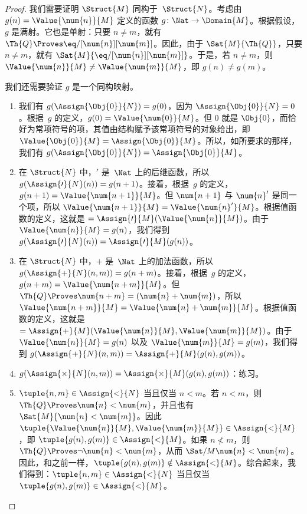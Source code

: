 \documentclass[../../../include/open-logic-section]{subfiles}
\begin{document}
\begin{proof}
我们需要证明 $\Struct{M}$ 同构于~$\Struct{N}$。考虑由 $g(n) = \Value{\num{n}}{M}$ 定义的函数 $g\colon \Nat \to \Domain{M}$。根据假设，$g$ 是满射。它也是单射：只要 $n \neq m$，就有 $\Th{Q} \Proves
\eq/[\num{n}][\num{m}]$。因此，由于 $\Sat{M}{\Th{Q}}$，只要 $n \neq m$，就有 $\Sat{M}{\eq/[\num{n}][\num{m}]}$。于是，若 $n \neq m$，则 $\Value{\num{n}}{M} \neq
\Value{\num{m}}{M}$，即 $g(n) \neq g(m)$。

我们还需要验证 $g$ 是一个同构映射。
\begin{enumerate}
\item 我们有 $g(\Assign{\Obj{0}}{N}) = g(0)$，因为 $\Assign{\Obj{0}}{N} = 0$。根据~$g$ 的定义，$g(0) =
  \Value{\num{0}}{M}$。但 $\num{0}$ 就是 $\Obj{0}$，而恰好为常项符号的项，其值由结构赋予该常项符号的对象给出，即 $\Value{\Obj{0}}{M} = \Assign{\Obj{0}}{M}$。所以，如所要求的那样，我们有 $g(\Assign{\Obj{0}}{N}) = \Assign{\Obj{0}}{M}$。
\item 在 $\Struct{N}$ 中，$\prime$ 是~$\Nat$ 上的后继函数，所以 $g(\Assign{\prime}{N}(n)) = g(n+1)$。接着，根据~$g$ 的定义，$g(n+1) =
  \Value{\num{n+1}}{M}$。但 $\num{n+1}$ 与 $\num{n}'$ 是同一个项，所以 $\Value{\num{n+1}}{M} =
  \Value{\num{n}'}{M}$。根据值函数的定义，这就是 $= \Assign{\prime}{M}(\Value{\num{n}}{M})$。由于 $\Value{\num{n}}{M} = g(n)$，我们得到 $g(\Assign{\prime}{N}(n)) =
  \Assign{\prime}{M}(g(n))$。
\item 在 $\Struct{N}$ 中，$+$ 是~$\Nat$ 上的加法函数，所以 $g(\Assign{+}{N}(n,m)) = g(n+m)$。接着，根据~$g$ 的定义，$g(n+m) =
  \Value{\num{n+m}}{M}$。但 $\Th{Q} \Proves
  \num{n+m} = (\num{n} + \num{m})$，所以 $\Value{\num{n+m}}{M} =
  \Value{\num{n}+\num{m}}{M}$。根据值函数的定义，这就是 $=
  \Assign{+}{M}(\Value{\num{n}}{M},\Value{\num{m}}{M})$。由于 $\Value{\num{n}}{M} = g(n)$ 以及 $\Value{\num{m}}{M} = g(m)$，我们得到 $g(\Assign{+}{N}(n, m)) = \Assign{+}{M}(g(n), g(m))$。
\item $g(\Assign{\times}{N}(n, m)) = \Assign{\times}{M}(g(n), g(m))$：练习。
\item $\tuple{n,m} \in \Assign{<}{N}$ 当且仅当 $n < m$。若 $n < m$，则 $\Th{Q} \Proves \num{n} < \num{m}$，并且也有 $\Sat{M}{\num{n} <
  \num{m}}$。因此 $\tuple{\Value{\num{n}}{M}, \Value{\num{m}}{M}} \in
  \Assign{<}{M}$，即 $\tuple{g(n), g(m)} \in \Assign{<}{M}$。如果 $n \not< m$，则 $\Th{Q} \Proves \lnot \num{n} < \num{m}$，从而 $\Sat/{M}{\num{n} < \num{m}}$。因此，和之前一样，$\tuple{g(n), g(m)} \notin \Assign{<}{M}$。综合起来，我们得到：$\tuple{n,m} \in \Assign{<}{N}$ 当且仅当 $\tuple{g(n), g(m)} \in
  \Assign{<}{M}$。
\end{enumerate}
\end{proof}
\end{document}
